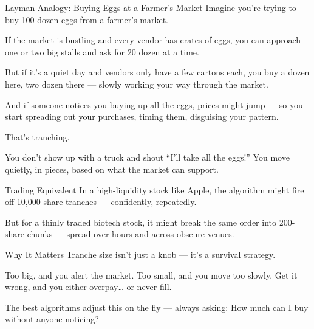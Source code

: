 Layman Analogy: Buying Eggs at a Farmer’s Market
Imagine you’re trying to buy 100 dozen eggs from a farmer’s market.

If the market is bustling and every vendor has crates of eggs, you can approach one or two big stalls and ask for 20 dozen at a time.

But if it’s a quiet day and vendors only have a few cartons each, you buy a dozen here, two dozen there — slowly working your way through the market.

And if someone notices you buying up all the eggs, prices might jump — so you start spreading out your purchases, timing them, disguising your pattern.

That’s tranching.

You don’t show up with a truck and shout “I’ll take all the eggs!”
You move quietly, in pieces, based on what the market can support.

Trading Equivalent
In a high-liquidity stock like Apple, the algorithm might fire off 10,000-share tranches — confidently, repeatedly.

But for a thinly traded biotech stock, it might break the same order into 200-share chunks — spread over hours and across obscure venues.

Why It Matters
Tranche size isn’t just a knob — it’s a survival strategy.

Too big, and you alert the market.
Too small, and you move too slowly.
Get it wrong, and you either overpay… or never fill.

The best algorithms adjust this on the fly — always asking:
How much can I buy without anyone noticing?

